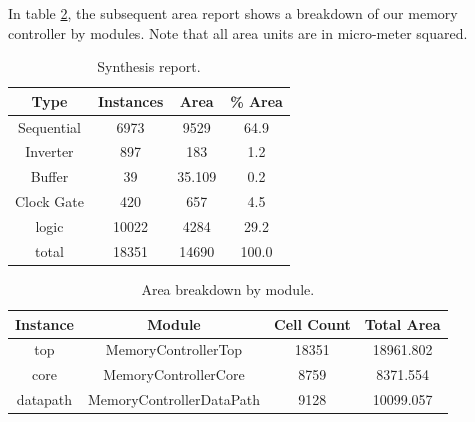 In table \ref{tab:area}, the subsequent area report shows a breakdown of our memory controller by modules. Note that all area units are in micro-meter squared.
\begin{table}[H]
    \centering
    \begin{tabular}{c|c|c|c}
         Type & Instances & Area & \% Area  \\
         \hline
         Sequential & 6973 & 9529 & 64.9 \\
         Inverter & 897 & 183 & 1.2 \\
         Buffer & 39 & 35.109 & 0.2 \\
         Clock Gate & 420 & 657 & 4.5 \\
         logic & 10022 & 4284  & 29.2 \\
         total & 18351 & 14690 & 100.0 \\
    \end{tabular}
    \caption{Synthesis report.}
    \label{tab:syn_report}
\end{table}

\begin{table}[H]
    \centering
    \begin{tabular}{c|c|c|c}
    Instance & Module & Cell Count & Total Area \\
    \hline
    top & MemoryControllerTop & 18351 & 18961.802 \\
    core & MemoryControllerCore & 8759 & 8371.554 \\ 
    datapath & MemoryControllerDataPath & 9128 & 10099.057\\
    \end{tabular}
    \caption{Area breakdown by module.}
    \label{tab:area}
\end{table}